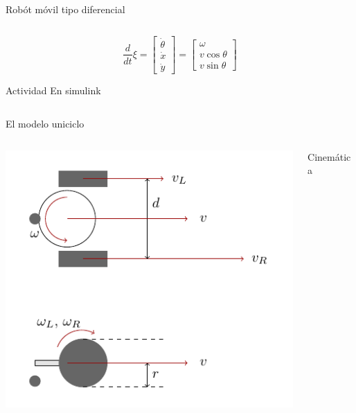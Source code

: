 \documentclass[presentation,aspectratio=169]{beamer}
\begin{document}
\begin{frame}[label={sec:orgdaed7db}]{Robót móvil tipo diferencial}
\begin{columns}
\begin{column}{0.6\columnwidth}
\[\frac{d}{dt} \xi = \begin{bmatrix} \dot{\theta}\\\dot{x}\\\dot{y} \end{bmatrix} = \begin{bmatrix} \omega\\ v\cos\theta\\v\sin\theta\end{bmatrix} \]


\pause

\alert{Actividad} En simulink
\end{column}
\end{columns}
\end{frame}



\begin{frame}[label={sec:orgacc7098}]{El modelo uniciclo}
\begin{columns}
\begin{column}{0.4\columnwidth}
\begin{center}
 \includegraphics[width=1.0\linewidth]{../figures/unicycle-model-details}
\end{center}
\end{column}

\begin{column}{0.6\columnwidth}
\alert{Cinemática}

\pause


\end{column}
\end{columns}
\end{frame}
\end{document}

